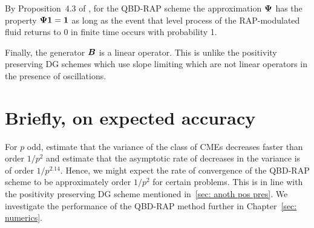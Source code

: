 By Proposition~4.3 of \cite{p2019}, for the QBD-RAP scheme the approximation \(\boldsymbol \Psi\) has the property \(\boldsymbol \Psi \boldsymbol 1=\boldsymbol 1\) as long as the event that level process of the RAP-modulated fluid returns to \(0\) in finite time occurs with probability 1. 

Finally, the generator \(\boldsymbol B\) is a linear operator. This is unlike the positivity preserving DG schemes which use slope limiting which are not linear operators in the presence of oscillations.

\section{Briefly, on expected accuracy}
For \(p\) odd, \cite{hht2020} estimate that the variance of the class of CMEs decreases faster than order \(1/p^2\) and estimate that the asymptotic rate of decreases in the variance is of order \(1/p^{2.14}\). Hence, we might expect the rate of convergence of the QBD-RAP scheme to be approximately order \(1/p^2\) for certain problems. This is in line with the positivity preserving DG scheme mentioned in~\ref{sec: anoth pos pres}. We investigate the performance of the QBD-RAP method further in Chapter~\ref{sec: numerics}.  %















